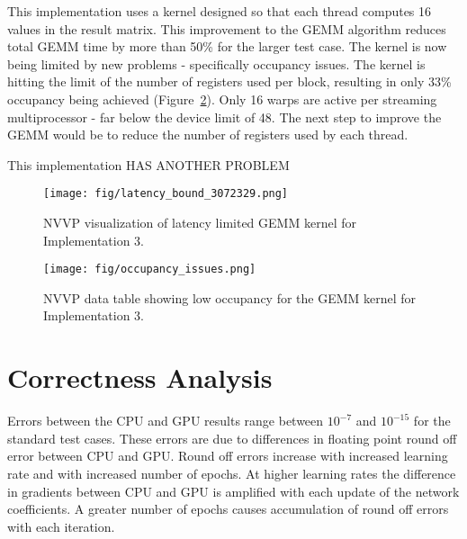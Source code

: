 \documentclass[12pt]{article}
\begin{document}
This implementation uses a kernel designed so that each thread computes 16 values in the result matrix. This improvement to the GEMM algorithm reduces total GEMM time by more than 50\% for the larger test case. The kernel is now being limited by new problems - specifically occupancy issues. The kernel is hitting the limit of the number of registers used per block, resulting in only 33\% occupancy being achieved (Figure~\ref{fig:occupancy_3}). Only 16 warps are active per streaming multiprocessor - far below the device limit of 48. The next step to improve the GEMM would be to reduce the number of registers used by each thread.

This implementation HAS ANOTHER PROBLEM

\begin{figure}[htb]
	\begin{center}
		\texttt{[image: fig/latency\_bound\_3072329.png]}
		\caption{NVVP visualization of latency limited GEMM kernel for Implementation 3.}
		\label{fig:lat_bnd_3}
	\end{center}
\end{figure}

\begin{figure}[htb]
	\begin{center}
		\texttt{[image: fig/occupancy\_issues.png]}
		\caption{NVVP data table showing low occupancy for the GEMM kernel for Implementation 3.}
		\label{fig:occupancy_3}
	\end{center}
\end{figure}



\section*{Correctness Analysis}

Errors between the CPU and GPU results range between $10^{-7}$ and $10^{-15}$ for the standard test cases. These errors are due to differences in floating point round off error between CPU and GPU. Round off errors increase with increased learning rate and with increased number of epochs. At higher learning rates the difference in gradients between CPU and GPU is amplified with each update of the network coefficients. A greater number of epochs causes accumulation of round off errors with each iteration.
\end{document}
